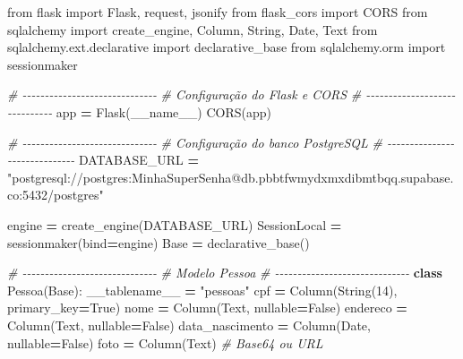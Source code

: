\documentclass[
]{book}
\newenvironment{Shaded}{\begin{snugshade}}{\end{snugshade}}
\newcommand{\CommentTok}[1]{\textcolor[rgb]{0.56,0.35,0.01}{\textit{#1}}}
\newcommand{\DecValTok}[1]{\textcolor[rgb]{0.00,0.00,0.81}{#1}}
\newcommand{\ImportTok}[1]{#1}
\newcommand{\KeywordTok}[1]{\textcolor[rgb]{0.13,0.29,0.53}{\textbf{#1}}}
\newcommand{\NormalTok}[1]{#1}
\newcommand{\OperatorTok}[1]{\textcolor[rgb]{0.81,0.36,0.00}{\textbf{#1}}}
\newcommand{\StringTok}[1]{\textcolor[rgb]{0.31,0.60,0.02}{#1}}
\newcommand{\VariableTok}[1]{\textcolor[rgb]{0.00,0.00,0.00}{#1}}
\begin{document}
\begin{Shaded}
\begin{Highlighting}[]
\ImportTok{from}\NormalTok{ flask }\ImportTok{import}\NormalTok{ Flask, request, jsonify}
\ImportTok{from}\NormalTok{ flask\_cors }\ImportTok{import}\NormalTok{ CORS}
\ImportTok{from}\NormalTok{ sqlalchemy }\ImportTok{import}\NormalTok{ create\_engine, Column, String, Date, Text}
\ImportTok{from}\NormalTok{ sqlalchemy.ext.declarative }\ImportTok{import}\NormalTok{ declarative\_base}
\ImportTok{from}\NormalTok{ sqlalchemy.orm }\ImportTok{import}\NormalTok{ sessionmaker}

\CommentTok{\# {-}{-}{-}{-}{-}{-}{-}{-}{-}{-}{-}{-}{-}{-}{-}{-}{-}{-}{-}{-}{-}{-}{-}{-}{-}{-}{-}{-}{-}{-}}
\CommentTok{\# Configuração do Flask e CORS}
\CommentTok{\# {-}{-}{-}{-}{-}{-}{-}{-}{-}{-}{-}{-}{-}{-}{-}{-}{-}{-}{-}{-}{-}{-}{-}{-}{-}{-}{-}{-}{-}{-}}
\NormalTok{app }\OperatorTok{=}\NormalTok{ Flask(}\VariableTok{\_\_name\_\_}\NormalTok{)}
\NormalTok{CORS(app)}

\CommentTok{\# {-}{-}{-}{-}{-}{-}{-}{-}{-}{-}{-}{-}{-}{-}{-}{-}{-}{-}{-}{-}{-}{-}{-}{-}{-}{-}{-}{-}{-}{-}}
\CommentTok{\# Configuração do banco PostgreSQL}
\CommentTok{\# {-}{-}{-}{-}{-}{-}{-}{-}{-}{-}{-}{-}{-}{-}{-}{-}{-}{-}{-}{-}{-}{-}{-}{-}{-}{-}{-}{-}{-}{-}}
\NormalTok{DATABASE\_URL }\OperatorTok{=} \StringTok{"postgresql://postgres:MinhaSuperSenha@db.pbbtfwmydxmxdibmtbqq.supabase.co:5432/postgres"}

\NormalTok{engine }\OperatorTok{=}\NormalTok{ create\_engine(DATABASE\_URL)}
\NormalTok{SessionLocal }\OperatorTok{=}\NormalTok{ sessionmaker(bind}\OperatorTok{=}\NormalTok{engine)}
\NormalTok{Base }\OperatorTok{=}\NormalTok{ declarative\_base()}

\CommentTok{\# {-}{-}{-}{-}{-}{-}{-}{-}{-}{-}{-}{-}{-}{-}{-}{-}{-}{-}{-}{-}{-}{-}{-}{-}{-}{-}{-}{-}{-}{-}}
\CommentTok{\# Modelo Pessoa}
\CommentTok{\# {-}{-}{-}{-}{-}{-}{-}{-}{-}{-}{-}{-}{-}{-}{-}{-}{-}{-}{-}{-}{-}{-}{-}{-}{-}{-}{-}{-}{-}{-}}
\KeywordTok{class}\NormalTok{ Pessoa(Base):}
\NormalTok{    \_\_tablename\_\_ }\OperatorTok{=} \StringTok{"pessoas"}
\NormalTok{    cpf }\OperatorTok{=}\NormalTok{ Column(String(}\DecValTok{14}\NormalTok{), primary\_key}\OperatorTok{=}\VariableTok{True}\NormalTok{)}
\NormalTok{    nome }\OperatorTok{=}\NormalTok{ Column(Text, nullable}\OperatorTok{=}\VariableTok{False}\NormalTok{)}
\NormalTok{    endereco }\OperatorTok{=}\NormalTok{ Column(Text, nullable}\OperatorTok{=}\VariableTok{False}\NormalTok{)}
\NormalTok{    data\_nascimento }\OperatorTok{=}\NormalTok{ Column(Date, nullable}\OperatorTok{=}\VariableTok{False}\NormalTok{)}
\NormalTok{    foto }\OperatorTok{=}\NormalTok{ Column(Text)  }\CommentTok{\# Base64 ou URL}


\end{Highlighting}
\end{Shaded}
\end{document}
